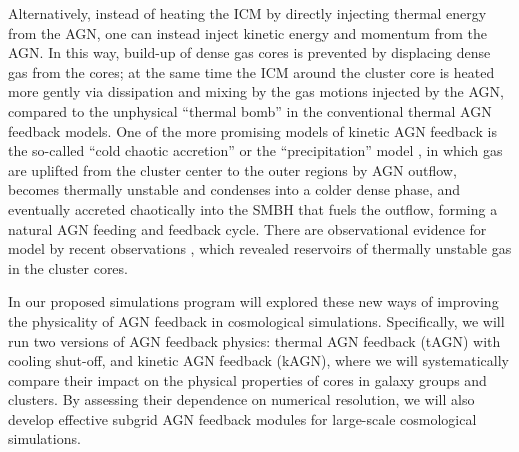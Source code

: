 \documentclass[letterpaper,11pt]{article}
\begin{document}
Alternatively, instead of heating the ICM by directly injecting thermal energy from the AGN, one can instead inject kinetic energy and momentum from the AGN. In this way,  build-up of dense gas cores is prevented by displacing dense gas from the cores; at the same time the ICM around the cluster core is heated more gently via dissipation and mixing by the gas motions injected by the AGN, compared to the unphysical ``thermal bomb'' in the conventional thermal AGN feedback models. One of the more promising models of kinetic AGN feedback is the so-called ``cold chaotic accretion''  \citep[CCA,][]{gaspari_etal13} or the ``precipitation'' model \citep{voit2018}, in which gas are uplifted from the cluster center to the outer regions by AGN outflow, becomes thermally unstable and condenses into a colder dense phase, and eventually accreted chaotically into the SMBH that fuels the outflow, forming a natural AGN feeding and feedback cycle. There are observational evidence for model by recent observations \citep[e.g.,][]{tremblay_etal16}, which revealed reservoirs of thermally unstable gas in the cluster cores. 

In our proposed simulations program will explored these new ways of improving the physicality of AGN feedback in cosmological simulations. Specifically, we will run two versions of AGN feedback physics:  thermal AGN feedback (tAGN) with cooling shut-off, 
and kinetic AGN feedback (kAGN), where we will systematically compare their impact on the physical properties of cores in galaxy groups and clusters. By assessing their dependence on numerical resolution, we will also develop effective subgrid AGN feedback modules for large-scale cosmological simulations. 
\end{document}
